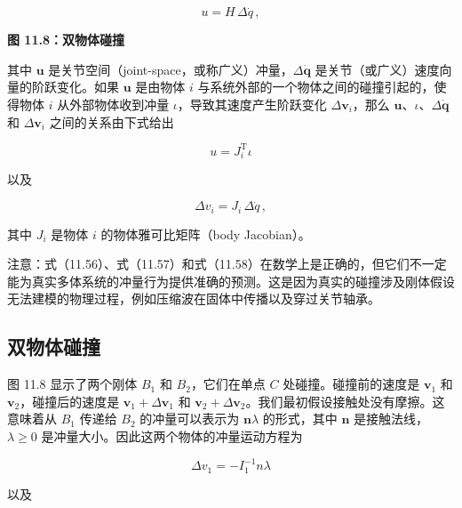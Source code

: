 \documentclass[10pt,a4paper]{book}
\theoremstyle{thmstyle} %
\theoremstyle{defstyle} %
\theoremstyle{prostyle} %
\begin{document}
$$
u = H \, \Delta \dot { q } \, ,
$$



\noindent\textbf{图 11.8：双物体碰撞}





其中 $\boldsymbol{u}$ 是关节空间（joint-space，或称广义）冲量，$\Delta \dot{\boldsymbol{q}}$ 是关节（或广义）速度向量的阶跃变化。如果 $\boldsymbol{u}$ 是由物体 $i$ 与系统外部的一个物体之间的碰撞引起的，使得物体 $i$ 从外部物体收到冲量 $\iota$，导致其速度产生阶跃变化 $\Delta \boldsymbol{v}_{i}$，那么 $\boldsymbol{u}$、$\iota$、$\Delta \dot{\boldsymbol{q}}$ 和 $\Delta \boldsymbol{v}_{i}$ 之间的关系由下式给出



$$
u = J _{i} ^{\mathrm{T}} \iota
$$



以及



$$
\Delta v _{i} = J _{i} \, \Delta \dot { q } \, ,
$$



其中 $J_{i}$ 是物体 $i$ 的物体雅可比矩阵（body Jacobian）。



注意：式（11.56）、式（11.57）和式（11.58）在数学上是正确的，但它们不一定能为真实多体系统的冲量行为提供准确的预测。这是因为真实的碰撞涉及刚体假设无法建模的物理过程，例如压缩波在固体中传播以及穿过关节轴承。



\subsection{双物体碰撞}





图 11.8 显示了两个刚体 $B_{1}$ 和 $B_{2}$，它们在单点 $C$ 处碰撞。碰撞前的速度是 $\boldsymbol{v}_{1}$ 和 $\boldsymbol{v}_{2}$，碰撞后的速度是 $\boldsymbol{v}_{1}+\Delta\boldsymbol{v}_{1}$ 和 $\boldsymbol{v}_{2}+\Delta\boldsymbol{v}_{2}$。我们最初假设接触处没有摩擦。这意味着从 $B_{1}$ 传递给 $B_{2}$ 的冲量可以表示为 $\boldsymbol{n}\lambda$ 的形式，其中 $\boldsymbol{n}$ 是接触法线，$\lambda\geq0$ 是冲量大小。因此这两个物体的冲量运动方程为



$$
\Delta v _{1} = - I _{1} ^{-1} n \lambda
$$



以及
\end{document}
